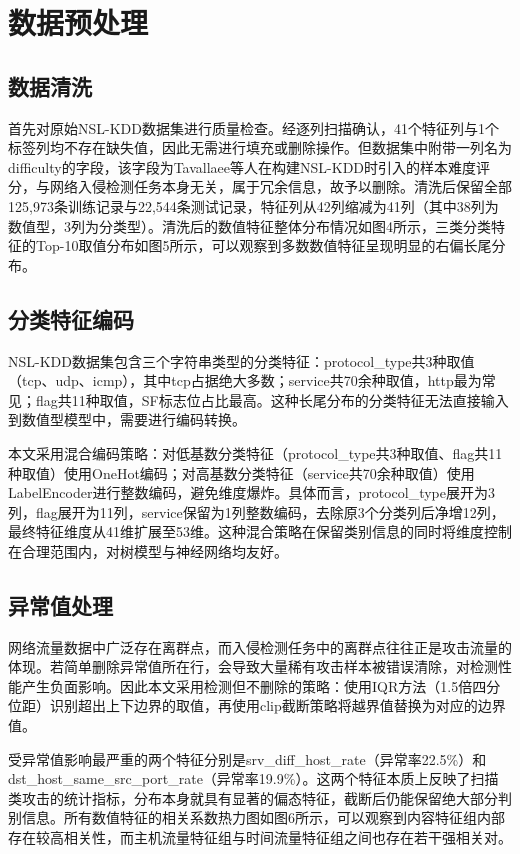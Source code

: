 \section{数据预处理}

\subsection{数据清洗}

首先对原始NSL-KDD数据集进行质量检查。经逐列扫描确认，41个特征列与1个标签列均不存在缺失值，因此无需进行填充或删除操作。但数据集中附带一列名为difficulty的字段，该字段为Tavallaee等人在构建NSL-KDD时引入的样本难度评分，与网络入侵检测任务本身无关，属于冗余信息，故予以删除。清洗后保留全部125,973条训练记录与22,544条测试记录，特征列从42列缩减为41列（其中38列为数值型，3列为分类型）。清洗后的数值特征整体分布情况如图4所示，三类分类特征的Top-10取值分布如图5所示，可以观察到多数数值特征呈现明显的右偏长尾分布。

\subsection{分类特征编码}

NSL-KDD数据集包含三个字符串类型的分类特征：protocol\_type共3种取值（tcp、udp、icmp），其中tcp占据绝大多数；service共70余种取值，http最为常见；flag共11种取值，SF标志位占比最高。这种长尾分布的分类特征无法直接输入到数值型模型中，需要进行编码转换。

本文采用混合编码策略：对低基数分类特征（protocol\_type共3种取值、flag共11种取值）使用OneHot编码；对高基数分类特征（service共70余种取值）使用LabelEncoder进行整数编码，避免维度爆炸。具体而言，protocol\_type展开为3列，flag展开为11列，service保留为1列整数编码，去除原3个分类列后净增12列，最终特征维度从41维扩展至53维。这种混合策略在保留类别信息的同时将维度控制在合理范围内，对树模型与神经网络均友好。

\subsection{异常值处理}

网络流量数据中广泛存在离群点，而入侵检测任务中的离群点往往正是攻击流量的体现。若简单删除异常值所在行，会导致大量稀有攻击样本被错误清除，对检测性能产生负面影响。因此本文采用检测但不删除的策略：使用IQR方法（1.5倍四分位距）识别超出上下边界的取值，再使用clip截断策略将越界值替换为对应的边界值。

受异常值影响最严重的两个特征分别是srv\_diff\_host\_rate（异常率22.5\%）和dst\_host\_same\_src\_port\_rate（异常率19.9\%）。这两个特征本质上反映了扫描类攻击的统计指标，分布本身就具有显著的偏态特征，截断后仍能保留绝大部分判别信息。所有数值特征的相关系数热力图如图6所示，可以观察到内容特征组内部存在较高相关性，而主机流量特征组与时间流量特征组之间也存在若干强相关对。


